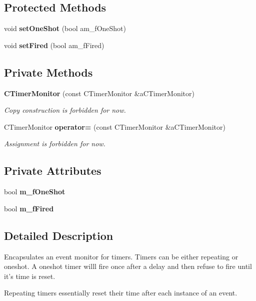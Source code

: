 \subsection*{Protected Methods}
\begin{CompactItemize}
\item 
void {\bf set\-One\-Shot} (bool am\_\-f\-One\-Shot)
\item 
void {\bf set\-Fired} (bool am\_\-f\-Fired)
\end{CompactItemize}
\subsection*{Private Methods}
\begin{CompactItemize}
\item 
{\bf CTimer\-Monitor} (const CTimer\-Monitor \&a\-CTimer\-Monitor)
\begin{CompactList}\small\item\em Copy construction is forbidden for now.\item\end{CompactList}\item 
CTimer\-Monitor {\bf operator=} (const CTimer\-Monitor \&a\-CTimer\-Monitor)
\begin{CompactList}\small\item\em Assignment is forbidden for now.\item\end{CompactList}\end{CompactItemize}
\subsection*{Private Attributes}
\begin{CompactItemize}
\item 
bool {\bf m\_\-f\-One\-Shot}
\item 
bool {\bf m\_\-f\-Fired}
\end{CompactItemize}


\subsection{Detailed Description}
Encapsulates an event monitor for timers. Timers can be either repeating or oneshot. A oneshot timer willl fire once after a delay and  then refuse to fire until it's time is reset.

Repeating timers essentially reset their time after each instance of an event. 



